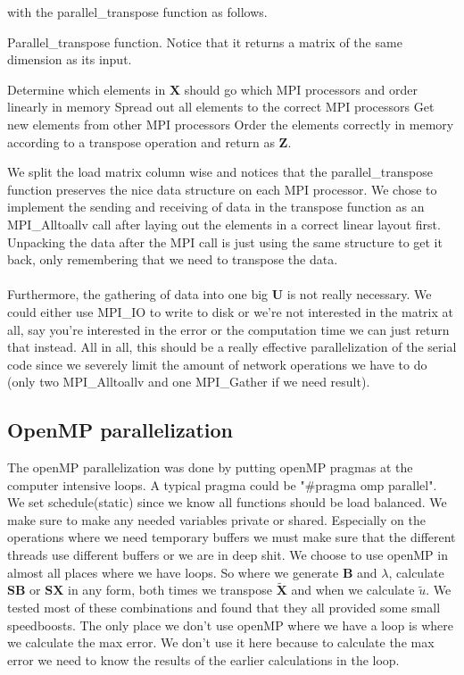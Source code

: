 \noindent with the parallel\_transpose function as follows.\\
\begin{algorithm}[H]
 \caption{Parallel\_transpose function. Notice that it returns a matrix of the same dimension as its input.}
 Determine which elements in $\mathbf{X}$ should go which MPI processors and order linearly in memory \;
 Spread out all elements to the correct MPI processors \;
 Get new elements from other MPI processors \;
 Order the elements correctly in memory according to a transpose operation and return as $\mathbf{Z}$.
 \label{code:transpose}
\end{algorithm}
\noindent We split the load matrix column wise and notices that the parallel\_transpose function preserves the nice data structure on each MPI processor. We chose to implement the sending and receiving of data in the transpose function as an MPI\_Alltoallv call after laying out the elements in a correct linear layout first. Unpacking the data after the MPI call is just using the same structure to get it back, only remembering that we need to transpose the data.
\\ \\
Furthermore, the gathering of data into one big $\mathbf{U}$ is not really necessary. We could either use MPI\_IO to write to disk or we're not interested in the matrix at all, say you're interested in the error or the computation time we can just return that instead. All in all, this should be a really effective parallelization of the serial code since we severely limit the amount of network operations we have to do (only two MPI\_Alltoallv and one MPI\_Gather if we need result).
\subsection*{OpenMP parallelization}
The openMP parallelization was done by putting openMP pragmas at the computer intensive loops. A typical pragma could be "\#pragma omp parallel". We set schedule(static) since we know all functions should be load balanced. We make sure to make any needed variables private or shared. Especially on the operations where we need temporary buffers we must make sure that the different threads use different buffers or we are in deep shit. We choose to use openMP in almost all places where we have loops. So where we generate $\mathbf{B}$ and $\lambda$, calculate $\mathbf{SB}$ or $\mathbf{SX}$ in any form, both times we transpose $\mathbf{\widetilde{X}}$ and when we calculate $\widetilde{u}$. We tested most of these combinations and found that they all provided some small speedboosts. The only place we don't use openMP where we have a loop is where we calculate the max error. We don't use it here because  to calculate the max error we need to know the results of the earlier calculations in the loop.
